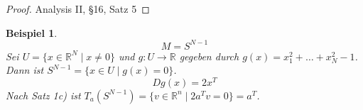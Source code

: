 \documentclass[10pt,a4paper]{report}
\newtheorem{example*}{Beispiel}
\begin{document}
\begin{proof}
  Analysis II, §16, Satz 5
\end{proof}

\begin{example*}
  \begin{equation}
    M = S^{N - 1}
  \end{equation}
  Sei $U = \{ x \in \mathbb{R}^{N} \mid x \ne 0 \}$ und $g : U \rightarrow \mathbb{R}$ gegeben durch $g(x) = x_{1}^{2} + \dots + x_{N}^{2} - 1$.
  Dann ist $S^{N - 1} = \{ x \in U \mid g(x) = 0 \}$.
  \begin{equation}
    Dg(x) = 2x^{T}
  \end{equation}
  Nach Satz 1c) ist $T_{a}(S^{N - 1}) = \{ v \in \mathbb{R}^{n} \mid 2a^{T}v = 0 \} = a^{T}$.
\end{example*}
\end{document}

